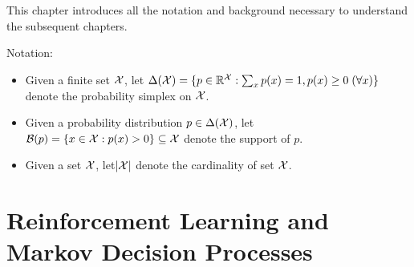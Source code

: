 
This chapter introduces all the notation and background necessary to understand the subsequent chapters.

Notation:
\begin{itemize}
  \item Given a finite set $\mathcal{X}$, let $\Delta(\mathcal{X})=\{p\in\mathbb{R}^{\mathcal{X}}:\sum_x p(x)=1, p(x)\geq 0\;(\forall x)\}$ denote the probability simplex on $\mathcal{X}$. 
  \item Given a probability distribution $p\in\Delta(\mathcal{X})$, let $\mathcal{B}(p)=\{x\in\mathcal{X}:p(x) > 0\}\subseteq\mathcal{X}$ denote the support of $p$.
  \item Given a set $\mathcal{X}$, let$\lvert\mathcal{X}\rvert$ denote the cardinality of set $\mathcal{X}$.
\end{itemize}
\section{Reinforcement Learning and Markov Decision Processes}




